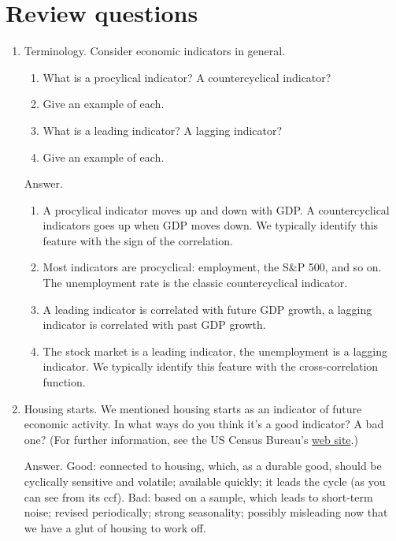 \section*{Review questions}

\setlength{\leftmargini}{.5\oldleftmargini}
\begin{enumerate}
\item Terminology. Consider economic indicators in general.
\begin{enumerate}
\item What is a procylical indicator? A countercyclical indicator?
\item Give an example of each.
\item What is a leading indicator?  A lagging indicator?
\item Give an example of each.
\end{enumerate}

Answer.
\begin{enumerate}
\item A procylical indicator moves up and down with GDP.
A countercyclical indicators goes up when GDP moves down.
We typically identify this feature with the sign of the correlation.
\item Most indicators are procyclical:  employment, the S\&P 500, and so on.
The unemployment rate is the classic countercyclical indicator.
\item A leading indicator is correlated with future GDP growth,
a lagging indicator is correlated with past GDP growth.
\item The stock market is a leading indicator,
the unemployment is a lagging indicator.
We typically identify this feature with the cross-correlation function.
\end{enumerate}


\item Housing starts.
We mentioned housing starts as an indicator
of future economic activity.
In what ways do you think it's a good indicator?  A bad one?
(For further information, see the US Census Bureau's
\href{http://www.census.gov/const/www/newresconstindex.html}
{web site}.)

Answer.  Good:  connected to housing, which, as a durable good,
should be cyclically sensitive and volatile; available quickly; it
leads the cycle (as you can see from its ccf). Bad: based on a sample,
which leads to short-term noise; revised periodically;
strong seasonality;
possibly misleading now that we have a glut of housing to work off.


\end{enumerate}
